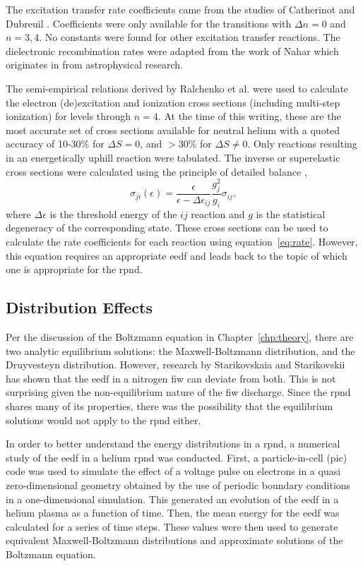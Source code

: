 The excitation transfer rate coefficients came from the studies of Catherinot
and Dubreuil \cite{Catherinot1981, Dubreuil1980}. Coefficients were only
available for the transitions with $\Delta n=0$ and $n=3,4$. No constants were
found for other excitation transfer reactions. The dielectronic recombination
rates were adapted from the work of Nahar \cite{Nahar2010} which originates in
from astrophysical research.

The semi-empirical relations derived by Ralchenko et al. \cite{Ralchenko2008}
were used to calculate the electron (de)excitation and ionization cross sections
(including multi-step ionization) for levels through $n=4$. At the time of this
writing, these are the most accurate set of cross sections available for neutral
helium with a quoted accuracy of 10-30\% for $\Delta S=0$, and $>30$\% for
$\Delta S \neq 0$. Only reactions resulting in an energetically uphill reaction
were tabulated. The inverse or superelastic cross sections were calculated using
the principle of detailed balance \cite{Kunze2009},
\begin{equation}
  \sigma_{ji}(\epsilon) = \frac{\epsilon}{\epsilon - \Delta\epsilon_{ij}}
    \frac{g_j^2}{g_i}\sigma_{ij},
\end{equation}
where $\Delta\epsilon$ is the threshold energy of the $ij$ reaction and $g$ is
the statistical degeneracy of the corresponding state. These cross sections can
be used to calculate the rate coefficients for each reaction using
equation~\ref{eq:rate}. However, this equation requires an appropriate
\acs{eedf} and leads back to the topic of which one is appropriate for the
\acs{rpnd}.

\subsection{Distribution Effects}\label{sec:dists}

Per the discussion of the Boltzmann equation in Chapter~\ref{chp:theory}, there
are two analytic equilibrium solutions: the Maxwell-Boltzmann distribution, and
the Druyvesteyn distribution. However, research by Starikovskaia and
Starikovskii \cite{Starikovskaia2001a} has shown that the \acs{eedf} in a
nitrogen \acs{fiw} can deviate from both. This is not surprising given the
non-equilibrium nature of the \acs{fiw} discharge. Since the \acs{rpnd} shares
many of its properties, there was the possibility that the equilibrium solutions
would not apply to the \acs{rpnd} either.

In order to better understand the energy distributions in a \acs{rpnd}, a
numerical study of the \acs{eedf} in a helium \acs{rpnd} was conducted. First, a
particle-in-cell (\acs{pic}) code was used to simulate the effect of a voltage
pulse on electrons in a quasi zero-dimensional geometry obtained by the use of
periodic boundary conditions in a one-dimensional simulation. This generated an
evolution of the \acs{eedf} in a helium plasma as a function of time. Then, the
mean energy for the \acs{eedf} was calculated for a series of time steps. These
values were then used to generate equivalent Maxwell-Boltzmann distributions and
approximate solutions of the Boltzmann equation.

